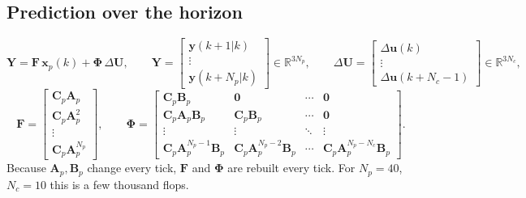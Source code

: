 \documentclass[11pt,a4paper]{article}
\newcommand{\vect}[1]{\bm{#1}}
\newcommand{\mat}[1]{\bm{#1}}
\newcommand{\Real}{\mathbb{R}}
\newcommand{\dU}{\Delta\vect{U}}
\newcommand{\du}{\Delta\vect{u}}
\newcommand{\Np}{N_p}
\newcommand{\Nc}{N_c}
\begin{document}
\subsection{Prediction over the horizon}
\begin{equation}
\vect Y = \mat F\,\vect x_p(k) + \mat\Phi\,\dU,
\qquad
\vect Y = \begin{bmatrix}\vect y(k+1|k)\\ \vdots\\ \vect y(k+\Np|k)\end{bmatrix}\in\Real^{3\Np},
\qquad
\dU = \begin{bmatrix}\du(k)\\ \vdots\\ \du(k+\Nc-1)\end{bmatrix}\in\Real^{3\Nc},
\end{equation}
\begin{equation}
\mat F = \begin{bmatrix}\mat C_p\mat A_p\\ \mat C_p\mat A_p^2\\ \vdots\\ \mat C_p\mat A_p^{\Np}\end{bmatrix},
\qquad
\mat\Phi = \begin{bmatrix}
\mat C_p\mat B_p & \mat 0 & \cdots & \mat 0\\
\mat C_p\mat A_p\mat B_p & \mat C_p\mat B_p & \cdots & \mat 0\\
\vdots & \vdots & \ddots & \vdots\\
\mat C_p\mat A_p^{\Np-1}\mat B_p & \mat C_p\mat A_p^{\Np-2}\mat B_p & \cdots & \mat C_p\mat A_p^{\Np-\Nc}\mat B_p
\end{bmatrix}.
\label{eq:FPhi}
\end{equation}
Because $\mat A_p,\mat B_p$ change every tick, $\mat F$ and $\mat\Phi$ are rebuilt every tick. For $\Np=40$, $\Nc=10$ this is a few thousand flops.
\end{document}
